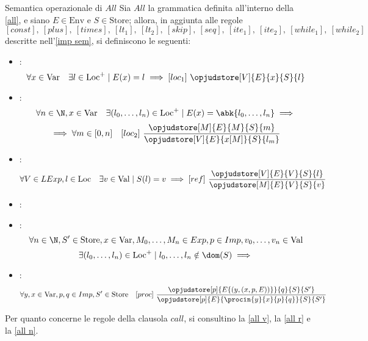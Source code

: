 \documentclass[a4paper, 12pt]{report}
\begin{document}
    \begin{framedprop}[label={all sem}, breakable]{Semantica operazionale di $All$}
        Sia $All$ la grammatica definita all'interno della \cref{all}, e siano $E \in \mathrm{Env}$ e $S \in \mathrm{Store}$; allora, in aggiunta alle regole $$[const], \ [plus], \ [times], \ [lt_1], \ [lt_2], \ [skip], \ [seq], \ [ite_1], \ [ite_2], \ [while_1], \ [while_2]$$ descritte nell'\cref{imp sem}, si definiscono le seguenti:

        \begin{itemize}
            \item {}: $$\forall x \in \mathrm{Var} \quad \exists l \in \mathrm{Loc}^+ \mid E(x) = l \implies [loc_1] \ \opjudstore[V]{E}{x}{S}{l}$$
            \item {}: $$\forall n \in \N, x \in \mathrm{Var} \quad \exists (l_0, \ldots, l_n) \in \mathrm{Loc}^+ \mid E(x) = \abk{l_0, \ldots, l_n} \implies$$ $$\implies \forall m \in [0, n] \quad [loc_2] \ \dfrac{\opjudstore[M]{E}{M}{S}{m}}{\opjudstore[V]{E}{x[M]}{S}{l_m}}$$
            \item {}: $$\forall V \in LExp, l \in \mathrm{Loc} \quad \exists v \in \mathrm{Val} \mid S(l) = v \implies [ref] \ \dfrac{\opjudstore[V]{E}{V}{S}{l}}{\opjudstore[M]{E}{V}{S}{v}}$$
            \item {}: 
            \item {}: $$\forall n \in \N, S' \in \mathrm{Store}, x \in \mathrm{Var}, M_0, \ldots, M_n \in Exp, p \in Imp, v_0, \ldots, v_n \in \mathrm{Val}$$ $$\exists (l_0, \ldots, l_n) \in \mathrm{Loc}^+ \mid l_0, \ldots, l_n \notin \dom(S) \implies$$ 
            \item {}: $$\forall y,x \in \mathrm{Var}, p, q \in Imp, S' \in \mathrm{Store} \quad [proc] \ \dfrac{\opjudstore[p]{E\{(y,(x,p, E))\}}{q}{S}{S'}}{\opjudstore[p]{E}{\procin{y}{x}{p}{q}}{S}{S'}}$$
        \end{itemize}

        Per quanto concerne le regole della clausola $call$, si consultino la \cref{all v}, la \cref{all r} e la \cref{all n}.
    \end{framedprop}
\end{document}
